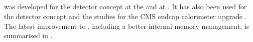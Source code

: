 

\subsection{\pandora}
\label{sec:pandoraPandoraPFA}



\pandora was developed for the \ILD detector concept \cite{Thomson:2009rp} at the \ILC and at \CLIC  \cite{Linssen:2012hp,Marshall:2012ry}. It has also been used for the \SiD detector concept \cite{Aihara:2010zz} and the studies for the CMS endcap calorimeter upgrade \cite{Contardo:2020886}. The latest improvement to \pandora, including a better internal memory management, is summarised in  \cite{Marshall:2015rfa}.


